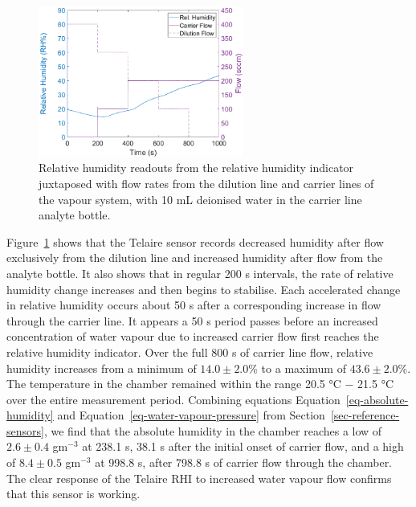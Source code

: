 \documentclass[
  a4paper,
]{scrbook}
\begin{document}
\begin{figure}

{\centering \includegraphics[width=0.6\textwidth,height=\textheight]{figures/ch9/RHI_verification.png}

}

\caption[Relative humidity readouts from the relative humidity indicator
juxtaposed with flow rates from the dilution line and carrier lines of
the vapour system.]{\label{fig-RHI-verification}Relative humidity
readouts from the relative humidity indicator juxtaposed with flow rates
from the dilution line and carrier lines of the vapour system, with 10
mL deionised water in the carrier line analyte bottle.}

\end{figure}

Figure~\ref{fig-RHI-verification} shows that the Telaire sensor records
decreased humidity after flow exclusively from the dilution line and
increased humidity after flow from the analyte bottle. It also shows
that in regular 200 s intervals, the rate of relative humidity change
increases and then begins to stabilise. Each accelerated change in
relative humidity occurs about 50 s after a corresponding increase in
flow through the carrier line. It appears a 50 s period passes before an
increased concentration of water vapour due to increased carrier flow
first reaches the relative humidity indicator. Over the full 800 s of
carrier line flow, relative humidity increases from a minimum of
\(14.0 \pm 2.0\)\% to a maximum of \(43.6 \pm 2.0\)\%. The temperature
in the chamber remained within the range 20.5 °C \(-\) 21.5 °C over the
entire measurement period. Combining equations
Equation~\ref{eq-absolute-humidity} and
Equation~\ref{eq-water-vapour-pressure} from
Section~\ref{sec-reference-sensors}, we find that the absolute humidity
in the chamber reaches a low of \(2.6\pm0.4\) gm\(^{-3}\) at 238.1 s,
38.1 s after the initial onset of carrier flow, and a high of
\(8.4 \pm 0.5\) gm\(^{-3}\) at 998.8 s, after 798.8 s of carrier flow
through the chamber. The clear response of the Telaire RHI to increased
water vapour flow confirms that this sensor is working.
\end{document}
